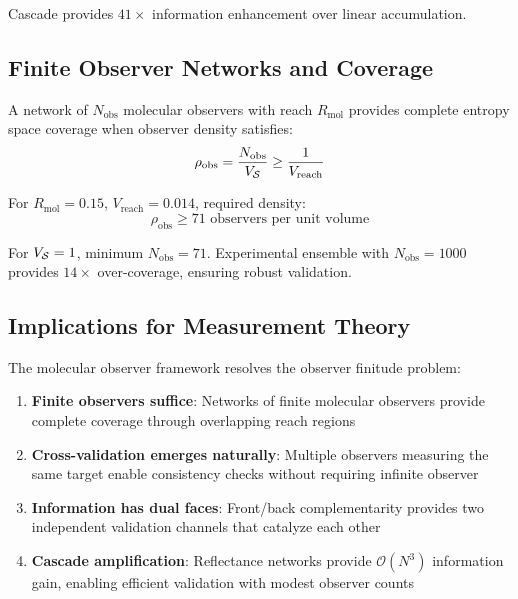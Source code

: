 \begin{theorem}
Cascade provides $41\times$ information enhancement over linear accumulation.

\subsection{Finite Observer Networks and Coverage}

\begin{proposition}
\label{prop:network_coverage}
A network of $N_{\text{obs}}$ molecular observers with reach $R_{\text{mol}}$ provides complete entropy space coverage when observer density satisfies:
\begin{equation}
\rho_{\text{obs}} = \frac{N_{\text{obs}}}{V_{\mathcal{S}}} \geq \frac{1}{V_{\text{reach}}}
\end{equation}
\end{proposition}

For $R_{\text{mol}} = 0.15$, $V_{\text{reach}} = 0.014$, required density:
\begin{equation}
\rho_{\text{obs}} \geq 71 \text{ observers per unit volume}
\end{equation}

For $V_{\mathcal{S}} = 1$, minimum $N_{\text{obs}} = 71$. Experimental ensemble with $N_{\text{obs}} = 1000$ provides $14\times$ over-coverage, ensuring robust validation.

\subsection{Implications for Measurement Theory}

The molecular observer framework resolves the observer finitude problem:

\begin{enumerate}
\item \textbf{Finite observers suffice}: Networks of finite molecular observers provide complete coverage through overlapping reach regions

\item \textbf{Cross-validation emerges naturally}: Multiple observers measuring the same target enable consistency checks without requiring infinite observer

\item \textbf{Information has dual faces}: Front/back complementarity provides two independent validation channels that catalyze each other

\item \textbf{Cascade amplification}: Reflectance networks provide $\mathcal{O}(N^3)$ information gain, enabling efficient validation with modest observer counts


\end{enumerate}
\end{theorem}
